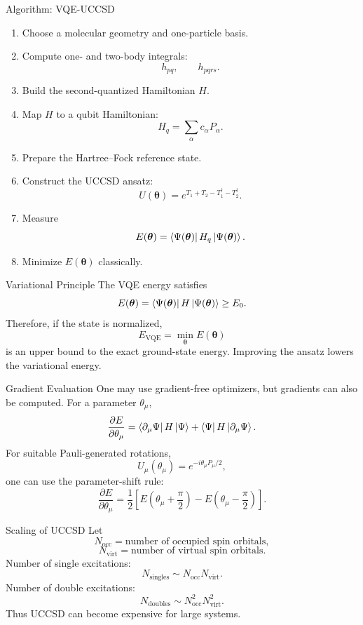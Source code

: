\documentclass[aspectratio=169]{beamer}
\begin{document}
\begin{frame}{Algorithm: VQE-UCCSD}
\small
\begin{enumerate}
\item Choose a molecular geometry and one-particle basis.
\item Compute one- and two-body integrals:
\[
h_{pq},\qquad h_{pqrs}.
\]
\item Build the second-quantized Hamiltonian \(H\).
\item Map \(H\) to a qubit Hamiltonian:
\[
H_q=\sum_\alpha c_\alpha P_\alpha.
\]
\item Prepare the Hartree--Fock reference state.
\item Construct the UCCSD ansatz:
\[
U(\bm{\theta})=e^{T_1+T_2-T_1^\dagger-T_2^\dagger}.
\]
\item Measure
\[
E(\bm{\theta})=\bra{\Psi(\bm{\theta})}H_q\ket{\Psi(\bm{\theta})}.
\]
\item Minimize \(E(\bm{\theta})\) classically.
\end{enumerate}
\end{frame}
\begin{frame}{Variational Principle}
The VQE energy satisfies
\[
E(\bm{\theta})
=
\bra{\Psi(\bm{\theta})}H\ket{\Psi(\bm{\theta})}
\geq
E_0.
\]
\vspace{0.3cm}
Therefore, if the state is normalized,
\[
E_{\mathrm{VQE}}
=
\min_{\bm{\theta}} E(\bm{\theta})
\]
is an upper bound to the exact ground-state energy.
\vspace{0.3cm}
Improving the ansatz lowers the variational energy.
\end{frame}
\begin{frame}{Gradient Evaluation}
One may use gradient-free optimizers, but gradients can also be computed.
For a parameter \(\theta_\mu\),
\[
\frac{\partial E}{\partial \theta_\mu}
=
\bra{\partial_\mu \Psi}H\ket{\Psi}
+
\bra{\Psi}H\ket{\partial_\mu \Psi}.
\]
\vspace{0.3cm}
For suitable Pauli-generated rotations,
\[
U_\mu(\theta_\mu)
=
e^{-i\theta_\mu P_\mu/2},
\]
one can use the parameter-shift rule:
\[
\frac{\partial E}{\partial \theta_\mu}
=
\frac12
\left[
E\left(\theta_\mu+\frac{\pi}{2}\right)
-
E\left(\theta_\mu-\frac{\pi}{2}\right)
\right].
\]
\end{frame}
\begin{frame}{Scaling of UCCSD}
Let
\[
N_{\mathrm{occ}} = \text{number of occupied spin orbitals},
\]
\[
N_{\mathrm{virt}} = \text{number of virtual spin orbitals}.
\]
\vspace{0.3cm}
Number of single excitations:
\[
N_{\mathrm{singles}}
\sim
N_{\mathrm{occ}}N_{\mathrm{virt}}.
\]
Number of double excitations:
\[
N_{\mathrm{doubles}}
\sim
N_{\mathrm{occ}}^2N_{\mathrm{virt}}^2.
\]
\vspace{0.3cm}
Thus UCCSD can become expensive for large systems.
\end{frame}
\end{document}
